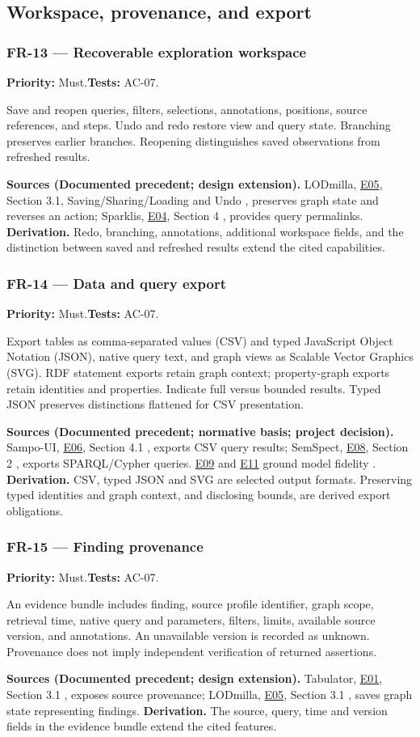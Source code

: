 \documentclass[11pt,a4paper]{article}
\newcommand{\req}[4]{\subsubsection*{#1 --- #2}\phantomsection\label{req:#1}\textbf{Priority:} #3.\quad\textbf{Tests:} #4.\par}
\newcommand{\origin}[3]{\par{\small\textbf{Sources (#1).} #2 \textbf{Derivation.} #3\par}}
\newcommand{\evidence}[1]{\hyperlink{evidence:#1}{#1}}
\begin{document}
\subsection{Workspace, provenance, and export}
\par\noindent\begin{minipage}{\linewidth}
\req{FR-13}{Recoverable exploration workspace}{Must}{AC-07}
Save and reopen queries, filters, selections, annotations, positions, source references, and steps. Undo and redo restore view and query state. Branching preserves earlier branches. Reopening distinguishes saved observations from refreshed results.
\origin{Documented precedent; design extension}{LODmilla, \evidence{E05}, Section 3.1, Saving/\allowbreak Sharing/\allowbreak Loading and Undo \citep{lodmilla}, preserves graph state and reverses an action; Sparklis, \evidence{E04}, Section 4 \citep{sparklis}, provides query permalinks.}{Redo, branching, annotations, additional workspace fields, and the distinction between saved and refreshed results extend the cited capabilities.}
\end{minipage}\par
\par\noindent\begin{minipage}{\linewidth}
\req{FR-14}{Data and query export}{Must}{AC-07}
Export tables as comma-separated values (CSV) and typed JavaScript Object Notation (JSON), native query text, and graph views as Scalable Vector Graphics (SVG). RDF statement exports retain graph context; property-graph exports retain identities and properties. Indicate full versus bounded results. Typed JSON preserves distinctions flattened for CSV presentation.
\origin{Documented precedent; normative basis; project decision}{Sampo-UI, \evidence{E06}, Section 4.1 \citep{sampoui}, exports CSV query results; SemSpect, \evidence{E08}, Section 2 \citep{semspect}, exports SPARQL/Cypher queries. \evidence{E09} and \evidence{E11} ground model fidelity \citep{rdfconcepts,opencypher}.}{CSV, typed JSON and SVG are selected output formats. Preserving typed identities and graph context, and disclosing bounds, are derived export obligations.}
\end{minipage}\par
\par\noindent\begin{minipage}{\linewidth}
\req{FR-15}{Finding provenance}{Must}{AC-07}
An evidence bundle includes finding, source profile identifier, graph scope, retrieval time, native query and parameters, filters, limits, available source version, and annotations. An unavailable version is recorded as unknown. Provenance does not imply independent verification of returned assertions.
\origin{Documented precedent; design extension}{Tabulator, \evidence{E01}, Section 3.1 \citep{tabulator}, exposes source provenance; LODmilla, \evidence{E05}, Section 3.1 \citep{lodmilla}, saves graph state representing findings.}{The source, query, time and version fields in the evidence bundle extend the cited features.}
\end{minipage}\par
\end{document}
